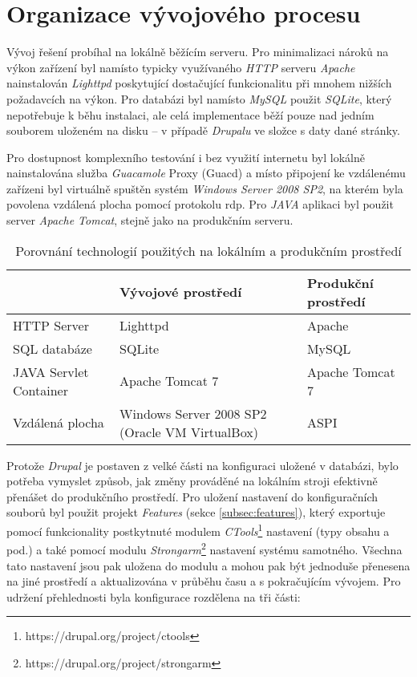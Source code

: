 \chapter{Organizace vývojového procesu}
\label{chap:vyvoj}

Vývoj řešení probíhal na lokálně běžícím serveru. Pro minimalizaci nároků na výkon zařízení byl namísto typicky využívaného \emph{HTTP} serveru \emph{Apache} nainstalován \emph{Lighttpd} poskytující dostačující funkcionalitu při mnohem nižších požadavcích na výkon. Pro databázi byl namísto \emph{MySQL} použit \emph{SQLite}, který nepotřebuje k běhu instalaci, ale celá implementace běží pouze nad jedním souborem uloženém na disku – v případě \emph{Drupalu} ve složce s daty dané stránky. 

Pro dostupnost komplexního testování i bez využití internetu byl lokálně nainstalována služba \emph{Guacamole} Proxy (Guacd) a místo připojení ke vzdálenému zařízeni byl virtuálně spuštěn systém \emph{Windows Server 2008 SP2}, na kterém byla povolena vzdálená plocha pomocí protokolu \gls{rdp}. Pro \emph{JAVA} aplikaci byl použit server \emph{Apache Tomcat}, stejně jako na produkčním serveru.

\begin{table}
  \caption{Porovnání technologií použitých na lokálním a produkčním prostředí}
  \begin{tabular}{ | p{3cm} | p{4cm} | p{4cm} | }
    \hline  
    & Vývojové prostředí & Produkční prostředí \\ \hline
    HTTP Server & Lighttpd & Apache \\ \hline
    SQL databáze & SQLite & MySQL \\ \hline
    JAVA Servlet Container & Apache Tomcat 7 & Apache Tomcat 7 \\ \hline
    Vzdálená plocha & Windows Server 2008 SP2 (Oracle VM VirtualBox) & ASPI \\ \hline
  \end{tabular}
\end{table}

Protože \emph{Drupal} je postaven z velké části na konfiguraci uložené v databázi, bylo potřeba vymyslet způsob, jak změny prováděné na lokálním stroji efektivně přenášet do produkčního prostředí. Pro uložení nastavení do konfiguračních souborů byl použit projekt \emph{Features} (sekce \ref{subsec:features}), který exportuje pomocí funkcionality postkytnuté modulem \emph{CTools}\footnote{https://drupal.org/project/ctools} nastavení (typy obsahu a pod.) a také pomocí modulu \emph{Strongarm}\footnote{https://drupal.org/project/strongarm} nastavení systému samotného. Všechna tato nastavení jsou pak uložena do modulu a mohou pak být jednoduše přenesena na jiné prostředí a aktualizována v průběhu času a s pokračujícím vývojem. Pro udržení přehlednosti byla konfigurace rozdělena na tři části:

